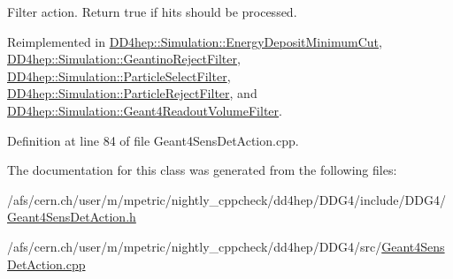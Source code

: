 Filter action. Return true if hits should be processed. 



Reimplemented in \hyperlink{struct_d_d4hep_1_1_simulation_1_1_energy_deposit_minimum_cut_ae2c50396bee48f509b0f2d3bc4ceee67}{D\+D4hep\+::\+Simulation\+::\+Energy\+Deposit\+Minimum\+Cut}, \hyperlink{struct_d_d4hep_1_1_simulation_1_1_geantino_reject_filter_a6237d315bdb20d7248dc09afc4866a3b}{D\+D4hep\+::\+Simulation\+::\+Geantino\+Reject\+Filter}, \hyperlink{struct_d_d4hep_1_1_simulation_1_1_particle_select_filter_aa24ab138bc02e2e02a06c4d75db74667}{D\+D4hep\+::\+Simulation\+::\+Particle\+Select\+Filter}, \hyperlink{struct_d_d4hep_1_1_simulation_1_1_particle_reject_filter_a3bf0977c00e9d94b45a1c2e0cb47448d}{D\+D4hep\+::\+Simulation\+::\+Particle\+Reject\+Filter}, and \hyperlink{class_d_d4hep_1_1_simulation_1_1_geant4_readout_volume_filter_a50031691fd40aa13e9fdcfe0203cd7f5}{D\+D4hep\+::\+Simulation\+::\+Geant4\+Readout\+Volume\+Filter}.



Definition at line 84 of file Geant4\+Sens\+Det\+Action.\+cpp.



The documentation for this class was generated from the following files\+:\begin{DoxyCompactItemize}
\item 
/afs/cern.\+ch/user/m/mpetric/nightly\+\_\+cppcheck/dd4hep/\+D\+D\+G4/include/\+D\+D\+G4/\hyperlink{_geant4_sens_det_action_8h}{Geant4\+Sens\+Det\+Action.\+h}\item 
/afs/cern.\+ch/user/m/mpetric/nightly\+\_\+cppcheck/dd4hep/\+D\+D\+G4/src/\hyperlink{_geant4_sens_det_action_8cpp}{Geant4\+Sens\+Det\+Action.\+cpp}\end{DoxyCompactItemize}
